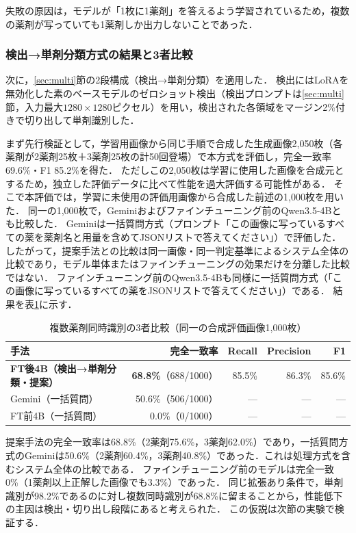 \documentclass[dvipdfmx]{jsarticle}
\begin{document}
失敗の原因は，モデルが「1枚に1薬剤」を答えるよう学習されているため，複数の薬剤が写っていても1薬剤しか出力しないことであった．

\subsubsection{検出→単剤分類方式の結果と3者比較}

次に，\ref{sec:multi}節の2段構成（検出→単剤分類）を適用した．
検出にはLoRAを無効化した素のベースモデルのゼロショット検出（検出プロンプトは\ref{sec:multi}節，入力最大$1280 \times 1280$ピクセル）を用い，検出された各領域をマージン2\%付きで切り出して単剤識別した．

まず先行検証として，学習用画像から同じ手順で合成した生成画像2,050枚（各薬剤が2薬剤25枚＋3薬剤25枚の計50回登場）で本方式を評価し，完全一致率69.6\%・F1 85.2\%を得た．
ただしこの2,050枚は学習に使用した画像を合成元とするため，独立した評価データに比べて性能を過大評価する可能性がある．
そこで本評価では，学習に未使用の評価用画像から合成した前述の1,000枚を用いた．
同一の1,000枚で，Geminiおよびファインチューニング前のQwen3.5-4Bとも比較した．
Geminiは一括質問方式（プロンプト「この画像に写っているすべての薬を薬剤名と用量を含めてJSONリストで答えてください」）で評価した．したがって，提案手法との比較は同一画像・同一判定基準によるシステム全体の比較であり，モデル単体またはファインチューニングの効果だけを分離した比較ではない．
ファインチューニング前のQwen3.5-4Bも同様に一括質問方式（「この画像に写っているすべての薬をJSONリストで答えてください」）である．
結果を表\ref{tab:multi_compare}に示す．

\begin{table}[htbp]
\centering
\caption{複数薬剤同時識別の3者比較（同一の合成評価画像1,000枚）}
\label{tab:multi_compare}
\small
\begin{tabular}{lrrrr}
\hline
手法 & 完全一致率 & Recall & Precision & F1 \\
\hline
\textbf{FT後4B（検出→単剤分類・提案）} & \textbf{68.8\%}（688/1000） & 85.5\% & 86.3\% & 85.6\% \\
Gemini（一括質問） & 50.6\%（506/1000） & --- & --- & --- \\
FT前4B（一括質問） & 0.0\%（0/1000） & --- & --- & --- \\
\hline
\end{tabular}
\end{table}

提案手法の完全一致率は68.8\%（2薬剤75.6\%，3薬剤62.0\%）であり，一括質問方式のGeminiは50.6\%（2薬剤60.4\%，3薬剤40.8\%）であった．これは処理方式を含むシステム全体の比較である．
ファインチューニング前のモデルは完全一致0\%（1薬剤以上正解した画像でも3.3\%）であった．
同じ拡張あり条件で，単剤識別が98.2\%であるのに対し複数同時識別が68.8\%に留まることから，性能低下の主因は検出・切り出し段階にあると考えられた．
この仮説は次節の実験で検証する．
\end{document}
